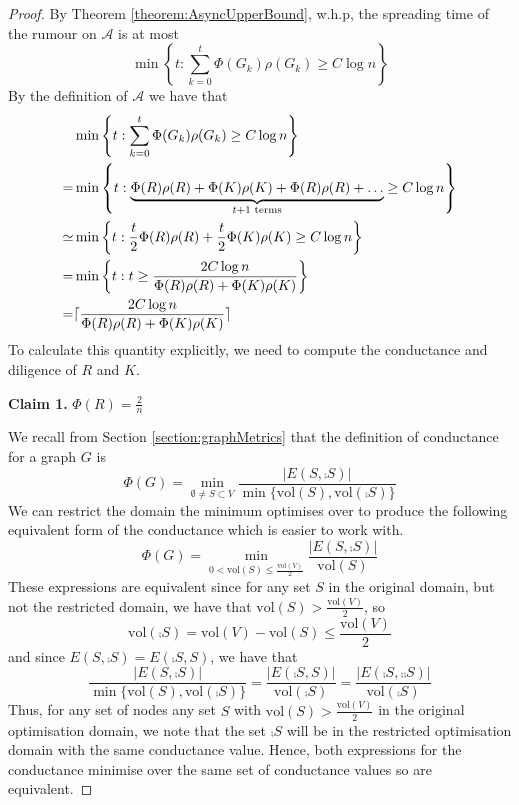 \begin{proof}
By Theorem \ref{theorem:AsyncUpperBound}, w.h.p, the spreading time of the rumour on $\mathcal{A}$ is at most
$$
	\min \left\{t : \sum_{k=0}^t \Phi(G_k)\rho(G_k) \geq C \log n \right\} 
$$
By the definition of $\mathcal{A}$ we have that 
\begin{align*}
	&\min \left\{t : \sum_{k=0}^t \Phi(G_k)\rho(G_k) \geq C \log n \right\} \\
	= &\min \left\{t : \underbrace{\Phi(R)\rho(R) + \Phi(K)\rho(K) + \Phi(R)\rho(R) + \dots}_{t + 1 \text{ terms}} \geq C \log n \right\} \\
	\simeq &\min \left\{t : \frac{t}{2}\Phi(R)\rho(R) + \frac{t}{2}\Phi(K)\rho(K) \geq C \log n \right\} \\
	= &\min \left\{t : t \geq \frac{2C \log n}{\Phi(R)\rho(R) + \Phi(K)\rho(K)} \right\} \\
	= &\lceil\frac{2C \log n}{\Phi(R)\rho(R) + \Phi(K)\rho(K)}\rceil
\end{align*} %
To calculate this quantity explicitly, we need to compute the conductance and diligence of $R$ and $K$. 

\textbf{Claim 1.} $\Phi(R)=\frac{2}{n}$

We recall from Section \ref{section:graphMetrics} that the definition of conductance for a graph $G$ is 
$$
	\Phi(G) 
	= \min_{\emptyset \neq S \subset V} \frac{|E(S, \comp{S})|}{\min\{\text{vol}(S), \text{vol}(\comp{S})\}} 
$$
We can restrict the domain the minimum optimises over to produce the following equivalent form of the conductance which is easier to work with.
$$
	\Phi(G) 
	= \min_{0 < \text{vol}(S) \leq \frac{\text{vol}(V)}{2}} \frac{|E(S, \comp{S})|}{\text{vol}(S)} 
$$
These expressions are equivalent since for any set $S$ in the original domain, but not the restricted domain, we have that $\text{vol}(S) > \frac{\text{vol}(V)}{2}$, so
$$
	\text{vol}(\comp{S}) 
	= \text{vol}(V) - \text{vol}(S) 
	\leq \frac{\text{vol}(V)}{2}
$$
and since $E(S, \comp{S}) = E(\comp{S}, S)$, we have that
$$
	\frac{|E(S, \comp{S})|}{\min\{\text{vol}(S), \text{vol}(\comp{S})\}} = \frac{|E(\comp{S}, S)|}{\text{vol}(\comp{S})} 
	= 
	\frac{|E(\comp{S}, \comp{\comp{S}})|}{\text{vol}(\comp{S})} 
$$
Thus, for any set of nodes any set $S$ with $\text{vol}(S) > \frac{\text{vol}(V)}{2}$ in the original optimisation domain, we note that the set $\comp{S}$ will be in the restricted optimisation  domain with the same conductance value. Hence, both expressions for the conductance minimise over the same set of conductance values so are equivalent.


\end{proof}
